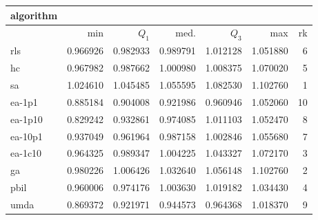 \begin{tabular}{@{}l*{5}{>{{}}N{1}{2}}>{{}}N{2}{0}@{}}
\toprule
{algorithm} &  \\
\midrule
& {min} & {$Q_1$} & {med.} & {$Q_3$} & {max} & {rk}\\
\midrule
rls & 0.966926 & 0.982933 & 0.989791 & 1.012128 & 1.051880 & 6\\
hc & 0.967982 & 0.987662 & 1.000980 & 1.008375 & 1.070020 & 5\\
sa & {\color{blue}} 1.024610 & {\color{blue}} 1.045485 & {\color{blue}} 1.055595 & {\color{blue}} 1.082530 & {\color{blue}} 1.102760 & 1\\
ea-1p1 & 0.885184 & 0.904008 & 0.921986 & 0.960946 & 1.052060 & 10\\
ea-1p10 & 0.829242 & 0.932861 & 0.974085 & 1.011103 & 1.052470 & 8\\
ea-10p1 & 0.937049 & 0.961964 & 0.987158 & 1.002846 & 1.055680 & 7\\
ea-1c10 & 0.964325 & 0.989347 & 1.004225 & 1.043327 & 1.072170 & 3\\
ga & 0.980226 & 1.006426 & 1.032640 & 1.056148 & {\color{blue}} 1.102760 & 2\\
pbil & 0.960006 & 0.974176 & 1.003630 & 1.019182 & 1.034430 & 4\\
umda & 0.869372 & 0.921971 & 0.944573 & 0.964368 & 1.018370 & 9\\
\bottomrule
\end{tabular}

